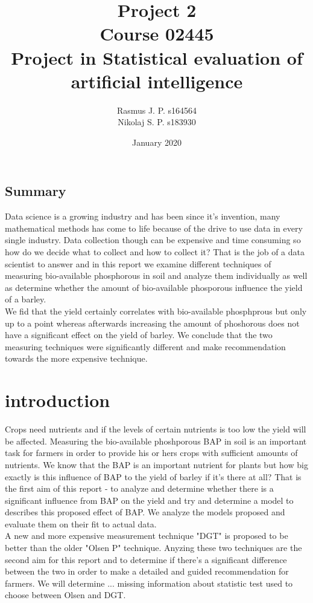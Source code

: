 \documentclass{article}
\begin{document}
\begin{titlepage}
	
	
	\title{Project 2 \\ Course 02445 \\ Project in Statistical evaluation of \\ artificial intelligence }
	\author{Rasmus J. P. s164564 \\ Nikolaj S. P. s183930}
	\date{January 2020}
	\maketitle
	
\subsection*{Summary}
Data science is a growing industry and has been since it's invention, many mathematical methods has come to life because of the drive to use data in every single industry. Data collection though can be expensive and time consuming so how do we decide what to collect and how to collect it? That is the job of a data scientist to answer and in this report we  examine different techniques of measuring bio-available phosphorous in soil and analyze them individually as well as determine whether the amount of bio-available phosporous influence the yield of a barley. \\ We fid that the yield certainly correlates with bio-available phosphprous but only up to a point whereas afterwards increasing the amount of phoshorous does not have a significant effect on the yield of barley. We conclude that the two measuring techniques were significantly different and make recommendation towards the more expensive technique.
	
\end{titlepage}


\section{introduction}
Crops need nutrients and if the levels of certain nutrients is too low the yield will be affected. Measuring the bio-available phoshporous BAP in soil is an important task for farmers in order to provide his or hers crops with sufficient amounts of nutrients. We know that the BAP is an important nutrient for plants but how big exactly is this influence of BAP to the yield of barley if it's there at all? That is the first aim of this report - to analyze and determine whether there is a significant influence from BAP on the yield and try and determine a model to describes this proposed effect of BAP. We analyze the models proposed and evaluate them on their fit to actual data. \\ A new and more expensive measurement technique "DGT" is proposed to be better than the older "Olsen P" technique. Anyzing these two techniques are the second aim for this report and to determine if there's a significant difference between the two in order to make a detailed and guided recommendation for farmers. We will determine  ... missing information about statistic test used to choose between Olsen and DGT.
\end{document}
